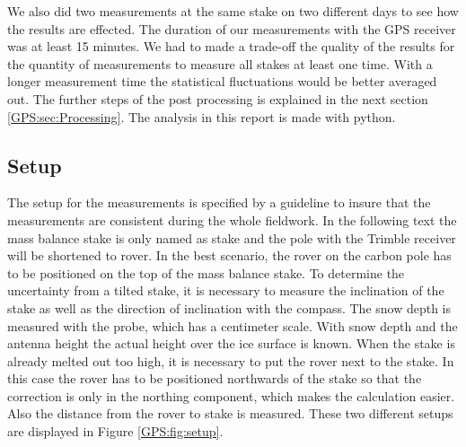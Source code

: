 We also did two measurements at the same stake on two different days to see how the results are effected.
The duration of our measurements with the GPS receiver was at least 15 minutes. 
We had to made a trade-off the quality of the results for the quantity of
measurements to measure all stakes at least one time. 
With a longer measurement time the statistical fluctuations would be better averaged out.
The further steps of the post processing is explained in the next section \ref{GPS:sec:Processing}.\newline
The analysis in this report is made with python.

\subsection{Setup} \label{GPS:subsec:setup}

The setup for the measurements is specified by a guideline to insure that the measurements are consistent during the whole fieldwork.
In the following text the mass balance stake is only named as stake and the pole with the Trimble receiver will be shortened to rover.
In the best scenario, the rover on the carbon pole has to be positioned on the top of the mass balance stake.
To determine the uncertainty from a tilted stake, it is necessary to measure the inclination of the stake as well as the direction of inclination with the compass.
The snow depth is measured with the probe, which has a centimeter scale.
With snow depth and the antenna height the actual height over the ice surface is known. 
When the stake is already melted out too high, it is necessary to put the rover next to the stake. 
In this case the rover has to be positioned northwards of the stake so that the correction is only in the northing component, which makes the calculation easier. 
Also the distance from the rover to stake is measured.
These two different setups are displayed in Figure \ref{GPS:fig:setup}.

